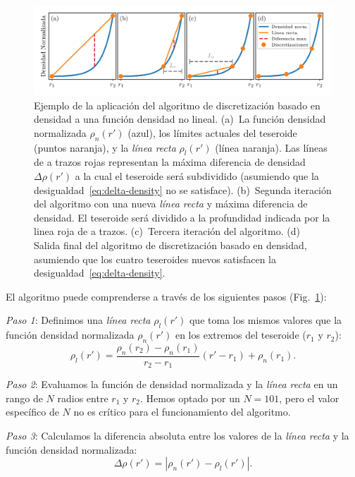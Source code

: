 \begin{figure}
\centering
\includegraphics[width=\linewidth]{figs/tesseroids-variable-density/density-based-discretization-algorithm.png}
\caption{
    Ejemplo de la aplicación del algoritmo de discretización basado en densidad
    a una función densidad no lineal.
    (a)~La función densidad normalizada $\rho_n(r')$ (azul), los límites
    actuales del teseroide (puntos naranja), y la \emph{línea recta}
    $\rho_l(r')$ (línea naranja).
    Las líneas de a trazos rojas representan la máxima diferencia de densidad
    $\Delta \rho (r')$ a la cual el teseroide será subdividido (asumiendo que
    la desigualdad~\ref{eq:delta-density} no se satisface).
    (b)~Segunda iteración del algoritmo con una nueva \emph{línea recta}
    y máxima diferencia de densidad. El teseroide será dividido a la
    profundidad indicada por la linea roja de a trazos.
    (c)~Tercera iteración del algoritmo.
    (d)~ Salida final del algoritmo de discretización basado en densidad,
    asumiendo que los cuatro teseroides nuevos satisfacen la
    desigualdad~\ref{eq:delta-density}.
}
\label{fig:density-discretization-algorithm}
\end{figure}


El algoritmo puede comprenderse a través de los siguientes pasos
(Fig.~\ref{fig:density-discretization-algorithm}):

\textit{Paso 1}:
Definimos una \emph{línea recta} $\rho_l(r')$ que toma los mismos valores que
la función densidad normalizada $\rho_n(r')$ en los extremos del teseroide
($r_1$ y $r_2$):
%
\begin{equation}
    \rho_l(r') =
    \frac{ \rho_n(r_2) - \rho_n(r_1) }{ r_2 - r_1 } (r' - r_1) + \rho_n(r_1).
    \label{eq:density-reference-line}
\end{equation}

\textit{Paso 2}:
Evaluamos la función de densidad normalizada y la \emph{línea recta} en un
rango de $N$ radios entre $r_1$ y $r_2$. Hemos optado por un $N = 101$, pero el
valor específico de $N$ no es crítico para el funcionamiento del algoritmo.

\textit{Paso 3}:
Calculamos la diferencia absoluta entre los valores de la \emph{línea recta}
y la función densidad normalizada:
%
\begin{equation}
    \Delta \rho (r') = | \rho_n(r') - \rho_l(r') |.
    \label{eq:density-abs-diff}
\end{equation}

